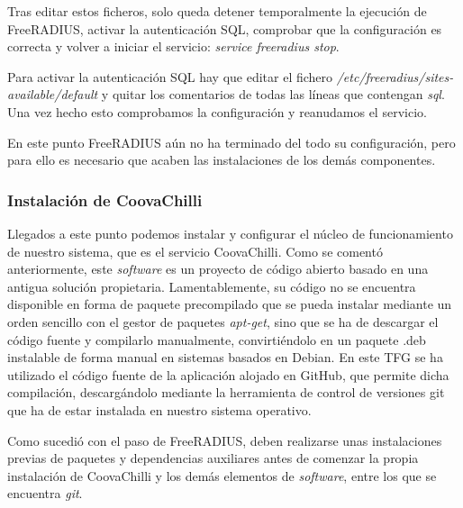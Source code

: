 Tras editar estos ficheros, solo queda detener temporalmente la ejecución de FreeRADIUS, activar la autenticación SQL, comprobar que la configuración es correcta y volver a iniciar el servicio: \emph{service freeradius stop}.

Para activar la autenticación SQL hay que editar el fichero \emph{/etc/freeradius/sites-available/default} y quitar los comentarios de todas las líneas que contengan \emph{sql}. Una vez hecho esto comprobamos la configuración y reanudamos el servicio.


En este punto FreeRADIUS aún no ha terminado del todo su configuración, pero para ello es necesario que acaben las instalaciones de los demás componentes.

\subsubsection{Instalación de CoovaChilli} \label{CoovaInstall}

Llegados a este punto podemos instalar y configurar el núcleo de funcionamiento de nuestro sistema, que es el servicio CoovaChilli. Como se comentó anteriormente, este \emph{software} es un proyecto de código abierto basado en una antigua solución propietaria. Lamentablemente, su código no se encuentra disponible en forma de paquete precompilado que se pueda instalar mediante un orden sencillo con el gestor de paquetes \emph{apt-get}, sino que se ha de descargar el código fuente y compilarlo manualmente, convirtiéndolo en un paquete .deb instalable de forma manual en sistemas basados en Debian. En este TFG se ha utilizado el código fuente de la aplicación alojado en GitHub, que permite dicha compilación, descargándolo mediante la herramienta de control de versiones git que ha de estar instalada en nuestro sistema operativo.

Como sucedió con el paso de FreeRADIUS, deben realizarse unas instalaciones previas de paquetes y dependencias auxiliares antes de comenzar la propia instalación de CoovaChilli y los demás elementos de \emph{software}, entre los que se encuentra \emph{git}.

